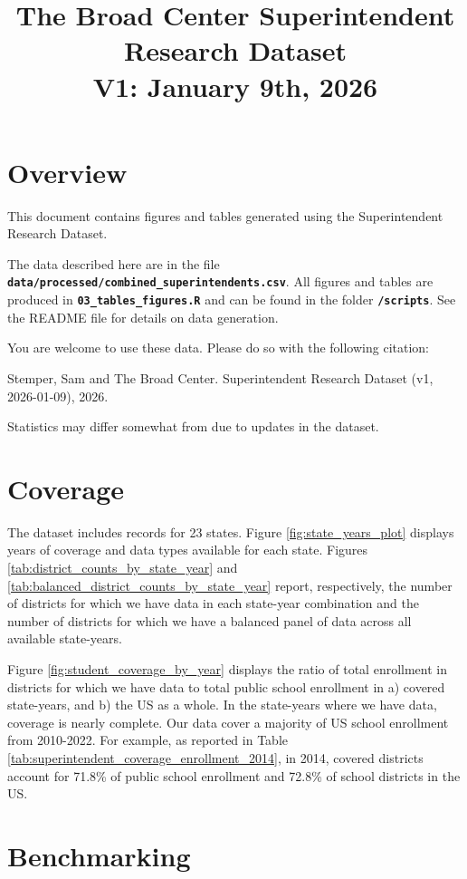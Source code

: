 \documentclass[12pt]{article}
\title{The Broad Center Superintendent Research Dataset \\  V1: January 9th, 2026}
\date{}
\begin{document}
\maketitle
\section{Overview}
This document contains figures and tables generated using the Superintendent Research Dataset. 

The data described here are in the file \textbf{\texttt{data/processed/combined\_superintendents.csv}}. All figures and tables are produced in \textbf{\texttt{03\_tables\_figures.R}} and can be found in the folder \textbf{\texttt{/scripts}}. See the README file for details on data generation. 

You are welcome to use these data. Please do so with the following citation: 

\noindent Stemper, Sam and The Broad Center. Superintendent Research Dataset (v1, 2026-01-09), 2026. 

Statistics may differ somewhat from \citet{stemper} due to updates in the dataset. 

\section{Coverage}
The dataset includes records for 23 states. Figure \ref{fig:state_years_plot} displays years of coverage and data types available for each state. Figures \ref{tab:district_counts_by_state_year} and \ref{tab:balanced_district_counts_by_state_year} report, respectively, the number of districts for which we have data in each state-year combination and the number of districts for which we have a balanced panel of data across all available state-years. 

Figure \ref{fig:student_coverage_by_year} displays the ratio of total enrollment in districts for which we have data to total public school enrollment in a) covered state-years, and b) the US as a whole. In the state-years where we have data, coverage is nearly complete. Our data cover a majority of US school enrollment from 2010-2022. For example, as reported in Table \ref{tab:superintendent_coverage_enrollment_2014}, in 2014, covered districts account for 71.8\% of public school enrollment and 72.8\% of school districts in the US. 

\section{Benchmarking}
\end{document}
